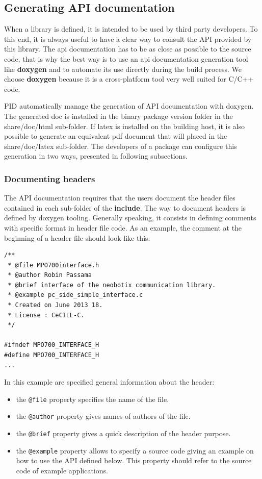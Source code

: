 \documentclass[12pt,a4paper]{article}
\begin{document}
\subsection{Generating API documentation}
\label{sec:apiCMake}

When a library is defined, it is intended to be used by third party developers. To this end, it is always useful to have a clear way to consult the API provided by this library. The api documentation has to be as close as possible to the source code, that is why the best way is to use an api documentation generation tool like \textbf{doxygen} and to automate its use directly during the build process. We choose \textbf{doxygen} because it is a cross-platform tool very well suited for C/C++ code. 

PID automatically manage the generation of API documentation with doxygen. The generated doc is installed in the binary package version folder in the share/doc/html sub-folder. If latex is installed on the building host, it is also possible to generate an equivalent pdf document that will placed in the share/doc/latex sub-folder. The developers of a package can configure this generation in two ways, presented in following subsections. 

\subsubsection{Documenting headers}
\label{sec:apiCMakeHeaders}


The API documentation requires that the users document the header files contained in each sub-folder of the \textbf{include}. The way to document headers is defined by doxygen tooling. Generally speaking, it consists in defining comments with specific format in header file code. As an example, the comment at the beginning of a header file should look like this:

\begin{verbatim}
/** 
 * @file MPO700interface.h 
 * @author Robin Passama
 * @brief interface of the neobotix communication library. 
 * @example pc_side_simple_interface.c
 * Created on June 2013 18.
 * License : CeCILL-C.
 */

#ifndef MPO700_INTERFACE_H
#define MPO700_INTERFACE_H
...
\end{verbatim}
In this example are specified general information about the header:
\begin{itemize}
\item the \texttt{@file} property specifies the name of the file.
\item the \texttt{@author} property gives names of authors of the file.
\item the \texttt{@brief} property gives a quick description of the header purpose.
\item  the \texttt{@example} property allows to specify a source code giving an example on how to use the API defined below. This property should refer to the source code of example applications.
\end{itemize}
\end{document}
